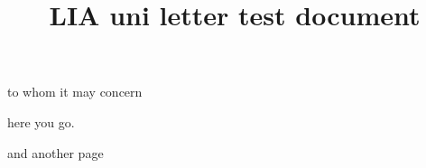 \documentclass{lia_uni_letter}
\title{LIA uni letter test document}
\begin{document}
\maketitle

to whom it may concern
\vspace{2cm}

here you go.

\pagebreak

and another page

\end{document}
